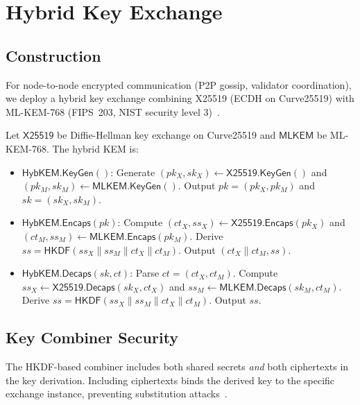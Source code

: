 \section{Hybrid Key Exchange}

\label{sec:hybrid-kex}

\subsection{Construction}

For node-to-node encrypted communication (P2P gossip, validator coordination), we
deploy a hybrid key exchange combining X25519 (ECDH on Curve25519) with ML-KEM-768
(FIPS~203, NIST security level 3)~\cite{fips203}.

\begin{definition}
\label{def:hybrid-kem}
Let $\textsf{X25519}$ be Diffie-Hellman key exchange on Curve25519 and $\textsf{MLKEM}$
be ML-KEM-768. The hybrid KEM is:
\begin{itemize}[leftmargin=2em]
  \item $\textsf{HybKEM.KeyGen}()$: Generate $(pk_X, sk_X) \leftarrow \textsf{X25519.KeyGen}()$
        and $(pk_M, sk_M) \leftarrow \textsf{MLKEM.KeyGen}()$.
        Output $pk = (pk_X, pk_M)$ and $sk = (sk_X, sk_M)$.
  \item $\textsf{HybKEM.Encaps}(pk)$: Compute $(ct_X, ss_X) \leftarrow \textsf{X25519.Encaps}(pk_X)$
        and $(ct_M, ss_M) \leftarrow \textsf{MLKEM.Encaps}(pk_M)$.
        Derive $ss = \textsf{HKDF}(ss_X \| ss_M \| ct_X \| ct_M)$.
        Output $(ct_X \| ct_M, ss)$.
  \item $\textsf{HybKEM.Decaps}(sk, ct)$: Parse $ct = (ct_X, ct_M)$.
        Compute $ss_X \leftarrow \textsf{X25519.Decaps}(sk_X, ct_X)$ and
        $ss_M \leftarrow \textsf{MLKEM.Decaps}(sk_M, ct_M)$.
        Derive $ss = \textsf{HKDF}(ss_X \| ss_M \| ct_X \| ct_M)$.
        Output $ss$.
\end{itemize}
\end{definition}

\subsection{Key Combiner Security}

The HKDF-based combiner includes both shared secrets \emph{and} both ciphertexts in
the key derivation. Including ciphertexts binds the derived key to the specific
exchange instance, preventing substitution attacks~\cite{rfc9180}.

